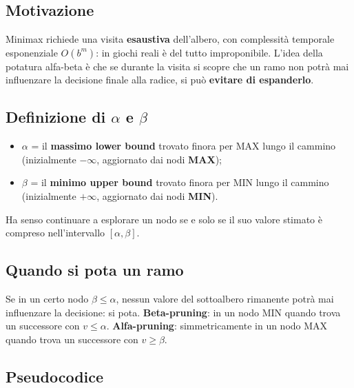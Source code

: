 \documentclass[11pt,a4paper]{report}
\begin{document}
\subsection*{Motivazione}

Minimax richiede una visita \textbf{esaustiva} dell'albero, con complessità temporale esponenziale $O(b^m)$: in giochi reali è del tutto improponibile. L'idea della potatura alfa-beta è che se durante la visita si scopre che un ramo non potrà mai influenzare la decisione finale alla radice, si può \textbf{evitare di espanderlo}.

\subsection*{Definizione di $\alpha$ e $\beta$}

\begin{itemize}
  \item $\alpha$ = il \textbf{massimo lower bound} trovato finora per MAX lungo il cammino (inizialmente $-\infty$, aggiornato dai nodi \textbf{MAX});
  \item $\beta$ = il \textbf{minimo upper bound} trovato finora per MIN lungo il cammino (inizialmente $+\infty$, aggiornato dai nodi \textbf{MIN}).
\end{itemize}

Ha senso continuare a esplorare un nodo se e solo se il suo valore stimato è compreso nell'intervallo $[\alpha,\beta]$.

\subsection*{Quando si pota un ramo}

Se in un certo nodo $\beta \le \alpha$, nessun valore del sottoalbero rimanente potrà mai influenzare la decisione: si pota. \textbf{Beta-pruning}: in un nodo MIN quando trova un successore con $v \le \alpha$. \textbf{Alfa-pruning}: simmetricamente in un nodo MAX quando trova un successore con $v \ge \beta$.

\subsection*{Pseudocodice}
\end{document}
